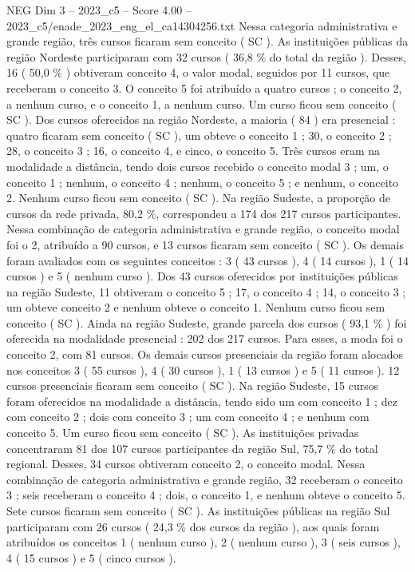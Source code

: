 \begin{textsample}{NEG Dim 3 – 2023\_c5 – Score 4.00 – 2023\_c5/enade\_2023\_eng\_el\_ca14304256.txt}
Nessa categoria administrativa e grande região, três cursos ficaram sem conceito ( SC ).
As instituições públicas da região Nordeste participaram com 32 cursos ( 36,8 \% do total da região ).
Desses, 16 ( 50,0 \% ) obtiveram conceito 4, o valor modal, seguidos por 11 cursos, que receberam o conceito 3.
O conceito 5 foi atribuído a quatro cursos ; o conceito 2, a nenhum curso, e o conceito 1, a nenhum curso.
Um curso ficou sem conceito ( SC ).
Dos cursos oferecidos na região Nordeste, a maioria ( 84 ) era presencial : quatro ficaram sem conceito ( SC ), um obteve o conceito 1 ; 30, o conceito 2 ; 28, o conceito 3 ; 16, o conceito 4, e cinco, o conceito 5.
Três cursos eram na modalidade a distância, tendo dois cursos recebido o conceito modal 3 ; um, o conceito 1 ; nenhum, o conceito 4 ; nenhum, o conceito 5 ; e nenhum, o conceito 2.
Nenhum curso ficou sem conceito ( SC ).
Na região Sudeste, a proporção de cursos da rede privada, 80,2 \%, correspondeu a 174 dos 217 cursos participantes.
Nessa combinação de categoria administrativa e grande região, o conceito modal foi o 2, atribuído a 90 cursos, e 13 cursos ficaram sem conceito ( SC ).
Os demais foram avaliados com os seguintes conceitos : 3 ( 43 cursos ), 4 ( 14 cursos ), 1 ( 14 cursos ) e 5 ( nenhum curso ).
Dos 43 cursos oferecidos por instituições públicas na região Sudeste, 11 obtiveram o conceito 5 ; 17, o conceito 4 ; 14, o conceito 3 ; um obteve conceito 2 e nenhum obteve o conceito 1.
Nenhum curso ficou sem conceito ( SC ).
Ainda na região Sudeste, grande parcela dos cursos ( 93,1 \% ) foi oferecida na modalidade presencial : 202 dos 217 cursos.
Para esses, a moda foi o conceito 2, com 81 cursos.
Os demais cursos presenciais da região foram alocados nos conceitos 3 ( 55 cursos ), 4 ( 30 cursos ), 1 ( 13 cursos ) e 5 ( 11 cursos ). 12 cursos presenciais ficaram sem conceito ( SC ).
Na região Sudeste, 15 cursos foram oferecidos na modalidade a distância, tendo sido um com conceito 1 ; dez com conceito 2 ; dois com conceito 3 ; um com conceito 4 ; e nenhum com conceito 5.
Um curso ficou sem conceito ( SC ).
As instituições privadas concentraram 81 dos 107 cursos participantes da região Sul, 75,7 \% do total regional.
Desses, 34 cursos obtiveram conceito 2, o conceito modal.
Nessa combinação de categoria administrativa e grande região, 32 receberam o conceito 3 ; seis receberam o conceito 4 ; dois, o conceito 1, e nenhum obteve o conceito 5.
Sete cursos ficaram sem conceito ( SC ).
As instituições públicas na região Sul participaram com 26 cursos ( 24,3 \% dos cursos da região ), aos quais foram atribuídos os conceitos 1 ( nenhum curso ), 2 ( nenhum curso ), 3 ( seis cursos ), 4 ( 15 cursos ) e 5 ( cinco cursos ).

\end{textsample}
